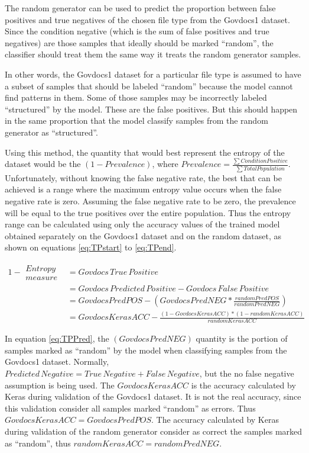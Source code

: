 The random generator can be used to predict the proportion between false positives and true negatives of the chosen file type from the Govdocs1 dataset. Since the condition negative (which is the sum of false positives and true negatives) are those samples that ideally should be marked ``random'', the classifier should treat them the same way it treats the random generator samples.

In other words, the Govdocs1 dataset for a particular file type is assumed to have a subset of samples that should be labeled ``random'' because the model cannot find patterns in them. Some of those samples may be incorrectly labeled ``structured'' by the model. These are the false positives. But this should happen in the same proportion that the model classify samples from the random generator as ``structured''.

Using this method, the quantity that would best represent the entropy of the dataset would be the $(1-Prevalence)$, where  $Prevalence=\frac{\sum ConditionPositive}{\sum TotalPopulation}$. Unfortunately, without knowing the false negative rate, the best that can be achieved is a range where the maximum entropy value occurs when the false negative rate is zero. Assuming the false negative rate to be zero, the prevalence will be equal to the true positives over the entire population. Thus the entropy range can be calculated using only the accuracy values of the trained model obtained separately on the Govdocs1 dataset and on the random dataset, as shown on equations \ref{eq:TPstart} to \ref{eq:TPend}.

\begin{align}
\label{eq:TPstart}
    1-\begin{matrix}
    Entropy\\
    measure
    \end{matrix}
      &= Govdocs\,True\,Positive \\
      &= Govdocs\,Predicted\,Positive - Govdocs\,False\,Positive\\
      &= GovdocsPredPOS - \left(GovdocsPredNEG*\frac{randomPredPOS}{randomPredNEG}\right)\label{eq:TPPred}\\
      &= GovdocsKerasACC - \frac{(1-GovdocsKerasACC)*(1-randomKerasACC)}{randomKerasACC}
      \label{eq:TPend}
\end{align}

In equation \ref{eq:TPPred}, the $(GovdocsPredNEG)$ quantity is the portion of samples marked as ``random'' by the model when classifying samples from the Govdocs1 dataset. Normally, $Predicted\,Negative = True\,Negative + False\, Negative$, but the no false negative assumption is being used. The $GovdocsKerasACC$ is the accuracy calculated by Keras during validation of the Govdocs1 dataset. It is not the real accuracy, since this validation consider all samples marked ``random'' as errors. Thus $GovdocsKerasACC = GovdocsPredPOS$. The accuracy calculated by Keras during validation of the random generator consider as correct the samples marked as ``random'', thus $randomKerasACC = randomPredNEG$.

